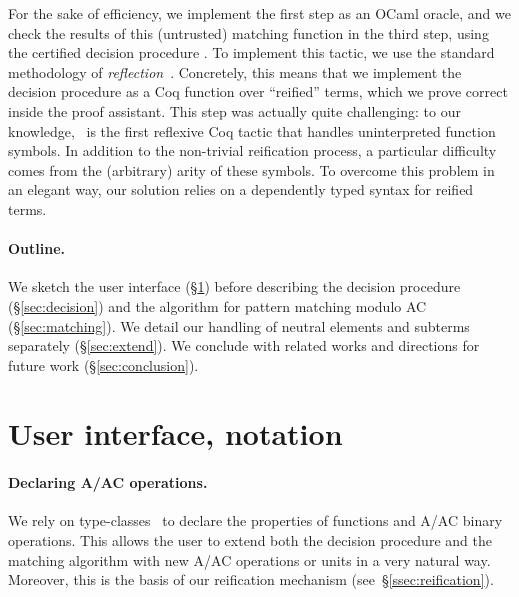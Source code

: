\documentclass{llncs}
\begin{document}
\noindent
For the sake of efficiency, we implement the first step as an OCaml
oracle, and we check the results of this (untrusted) matching function
in the third step, using the certified decision procedure \tac. To
implement this tactic, we use the standard methodology of
\emph{reflection}~\cite{BoyerMoore81,ACHA-reflection,gregoire-mahboubi-05}.
Concretely, this means that we implement the decision procedure as a
Coq function over ``reified'' terms, which we prove correct inside the
proof assistant.
This step was actually quite challenging: to our knowledge, \tac\ is
the first reflexive Coq tactic that handles uninterpreted function
symbols. In addition to the non-trivial reification process, a
particular difficulty comes from the (arbitrary) arity of these
symbols. To overcome this problem in an elegant way, our solution
relies on a dependently typed syntax for reified terms.


\paragraph{Outline.}

We sketch the user interface (\S\ref{sec:overall}) before describing
the decision procedure (\S\ref{sec:decision}) and the algorithm for
pattern matching modulo AC (\S\ref{sec:matching}). We detail our
handling of neutral elements and subterms separately
(\S\ref{sec:extend}). We conclude with related works and directions
for future work (\S\ref{sec:conclusion}).


\section{User interface, notation}
\label{sec:overall}

\paragraph{Declaring A/AC operations.}

We rely on type-classes~\cite{SozeauOury08} to declare the properties
of functions and A/AC binary operations. This allows the user to
extend both the decision procedure and the matching algorithm with new
A/AC operations or units in a very natural way. Moreover, this is the
basis of our reification mechanism (see~\S\ref{ssec:reification}).
\end{document}
